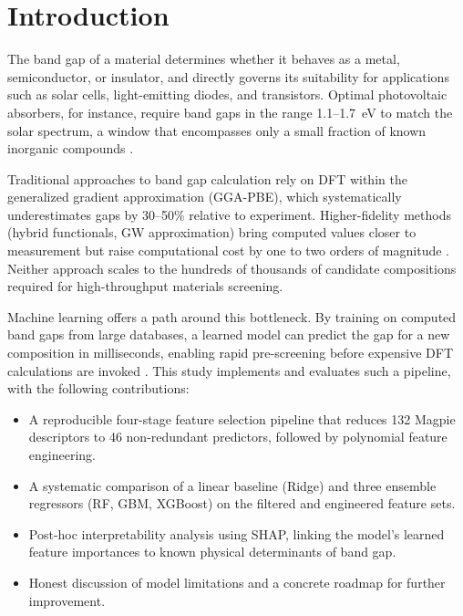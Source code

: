 \documentclass[conference]{IEEEtran}
\begin{document}
\section{Introduction}

The band gap of a material determines whether it behaves as a metal, semiconductor, or insulator, and directly governs its suitability for applications such as solar cells, light-emitting diodes, and transistors. Optimal photovoltaic absorbers, for instance, require band gaps in the range 1.1--1.7~eV to match the solar spectrum, a window that encompasses only a small fraction of known inorganic compounds \cite{shockley1961}.

Traditional approaches to band gap calculation rely on DFT within the generalized gradient approximation (GGA-PBE), which systematically underestimates gaps by 30--50\% relative to experiment. Higher-fidelity methods (hybrid functionals, GW approximation) bring computed values closer to measurement but raise computational cost by one to two orders of magnitude \cite{perdew1996}. Neither approach scales to the hundreds of thousands of candidate compositions required for high-throughput materials screening.

Machine learning offers a path around this bottleneck. By training on computed band gaps from large databases, a learned model can predict the gap for a new composition in milliseconds, enabling rapid pre-screening before expensive DFT calculations are invoked \cite{ward2016}. This study implements and evaluates such a pipeline, with the following contributions:

\begin{itemize}
  \item A reproducible four-stage feature selection pipeline that reduces 132 Magpie descriptors to 46 non-redundant predictors, followed by polynomial feature engineering.
  \item A systematic comparison of a linear baseline (Ridge) and three ensemble regressors (RF, GBM, XGBoost) on the filtered and engineered feature sets.
  \item Post-hoc interpretability analysis using SHAP, linking the model's learned feature importances to known physical determinants of band gap.
  \item Honest discussion of model limitations and a concrete roadmap for further improvement.
\end{itemize}
\end{document}
